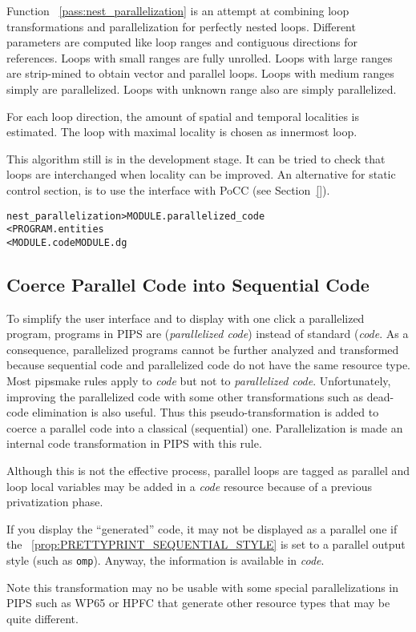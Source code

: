 \documentclass[a4paper]{report}
\newenvironment{PipsMake}{\begin{alltt}}{\end{alltt}}
\newcommand{\PipsPropRef}[1]{\texttt{\detokenize{#1}}~\ref{prop:#1}}
\newcommand{\PipsPassRef}[1]{\texttt{\detokenize{#1}}~\ref{pass:#1}}
\newenvironment{PipsPass}[1]{\label{pass:#1}}{}
\begin{document}
\begin{PipsPass}{nest_parallelization}
Function \PipsPassRef{nest_parallelization} is an attempt at combining loop
transformations and parallelization for perfectly nested
loops. Different parameters are computed like loop ranges and contiguous
directions for references. Loops with small ranges are fully
unrolled. Loops with large ranges are strip-mined to obtain vector and
parallel loops. Loops with medium ranges simply are parallelized. Loops
with unknown range also are simply parallelized.

For each loop direction, the amount of spatial and temporal localities
is estimated. The loop with maximal locality is chosen as innermost
loop.

This algorithm still is in the development stage. It can be tried to
check that loops are interchanged when locality can be
improved. An alternative for static control
section, is to use the interface with PoCC (see Section~\ref{}).

\end{PipsPass}

\begin{PipsMake}
nest_parallelization                    > MODULE.parallelized_code
        < PROGRAM.entities
        < MODULE.code MODULE.dg
\end{PipsMake}


\subsection{Coerce Parallel Code into Sequential Code}
\label{sec:cons-parall-code}

\begin{PipsPass}{internalize_parallel_code}
To simplify the user interface and to display with one click a
parallelized program, programs in PIPS are ({\em parallelized code})
instead of standard ({\em code}. As a consequence, parallelized
programs cannot be further analyzed and transformed because sequential
code and parallelized code do not have the same resource type. Most
pipsmake rules apply to {\em code} but not to {\em parallelized
code}. Unfortunately, improving the parallelized code with some other
transformations such as dead-code elimination is also useful. Thus
this pseudo-transformation is added to coerce a parallel code into a
classical (sequential) one. Parallelization is made an internal code
transformation in PIPS with this rule.

Although this is not the effective process, parallel loops are tagged
as parallel and loop local variables may be added in a {\em code}
resource because of a previous privatization phase.

If you display the ``generated'' code, it may not be displayed as a
parallel one if the \PipsPropRef{PRETTYPRINT_SEQUENTIAL_STYLE} is set
to a parallel output style (such as \texttt{omp}). Anyway, the information
is available in {\em code}.

Note this transformation may no be usable with some special
parallelizations in PIPS such as WP65 or HPFC that generate other resource
types that may be quite different.
\end{PipsPass}
\end{document}
